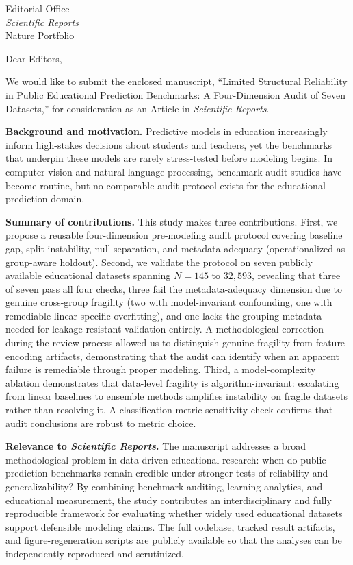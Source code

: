 \documentclass[11pt]{letter}
\date{May 18, 2026}
\begin{document}
\begin{letter}{Editorial Office \\ \textit{Scientific Reports} \\ Nature Portfolio}

\opening{Dear Editors,}

We would like to submit the enclosed manuscript, ``Limited Structural Reliability in Public Educational Prediction Benchmarks: A Four-Dimension Audit of Seven Datasets,'' for consideration as an Article in \textit{Scientific Reports}.

\textbf{Background and motivation.}
Predictive models in education increasingly inform high-stakes decisions about students and teachers, yet the benchmarks that underpin these models are rarely stress-tested before modeling begins. In computer vision and natural language processing, benchmark-audit studies have become routine, but no comparable audit protocol exists for the educational prediction domain.

\textbf{Summary of contributions.}
This study makes three contributions. First, we propose a reusable four-dimension pre-modeling audit protocol covering baseline gap, split instability, null separation, and metadata adequacy (operationalized as group-aware holdout). Second, we validate the protocol on seven publicly available educational datasets spanning $N = 145$ to $32{,}593$, revealing that three of seven pass all four checks, three fail the metadata-adequacy dimension due to genuine cross-group fragility (two with model-invariant confounding, one with remediable linear-specific overfitting), and one lacks the grouping metadata needed for leakage-resistant validation entirely. A methodological correction during the review process allowed us to distinguish genuine fragility from feature-encoding artifacts, demonstrating that the audit can identify when an apparent failure is remediable through proper modeling. Third, a model-complexity ablation demonstrates that data-level fragility is algorithm-invariant: escalating from linear baselines to ensemble methods amplifies instability on fragile datasets rather than resolving it. A classification-metric sensitivity check confirms that audit conclusions are robust to metric choice.

\textbf{Relevance to \textit{Scientific Reports}.}
The manuscript addresses a broad methodological problem in data-driven educational research: when do public prediction benchmarks remain credible under stronger tests of reliability and generalizability? By combining benchmark auditing, learning analytics, and educational measurement, the study contributes an interdisciplinary and fully reproducible framework for evaluating whether widely used educational datasets support defensible modeling claims. The full codebase, tracked result artifacts, and figure-regeneration scripts are publicly available so that the analyses can be independently reproduced and scrutinized.


\end{letter}
\end{document}
